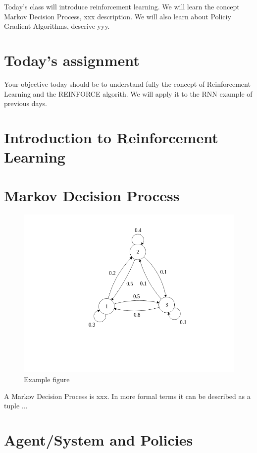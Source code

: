 Today's class will introduce reinforcement learning. We will learn the concept Markov Decision Process,
xxx description. We will also learn about Policiy Gradient Algorithms, descrive yyy.

\section{Today's assignment}

Your objective today should be to understand fully the concept of Reinforcement
Learning and the REINFORCE algorith. We will apply it to the RNN example of
previous days.

\section{Introduction to Reinforcement Learning}

\section{Markov Decision Process}

\begin{figure}[!ht]
\centering
\includegraphics[scale=0.6]{figs/reinforcement_learning/mdp.png}
\caption{Example figure}
\label{fig:MarkovDecisionProcess}
\end{figure}

A Markov Decision Process is xxx. In more formal terms it can be described as a tuple ...


\section{Agent/System and Policies}

